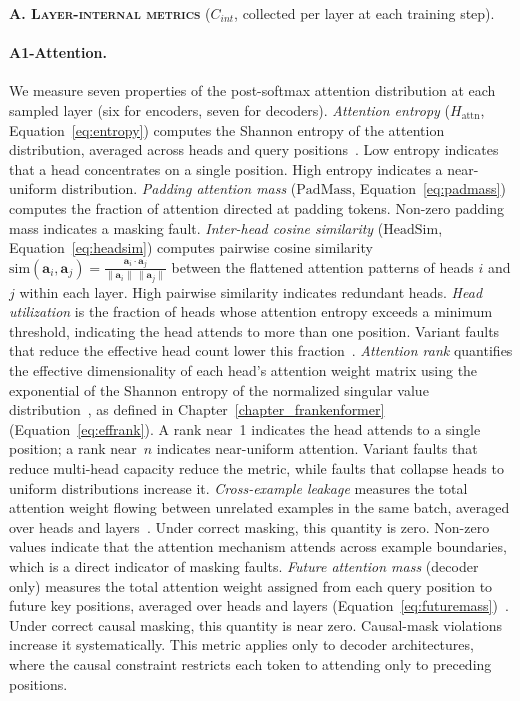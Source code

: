 \vspace{0.5em}
\noindent\textbf{\textsc{A. Layer-internal metrics}} ($C_{int}$, collected per layer at each training step).

\paragraph{A1-Attention.} We measure seven properties of the post-softmax attention distribution at each sampled layer (six for encoders, seven for decoders). \emph{Attention entropy} ($H_{\text{attn}}$, Equation~\ref{eq:entropy}) computes the Shannon entropy of the attention distribution, averaged across heads and query positions~\cite{voita2019analyzing}. Low entropy indicates that a head concentrates on a single position. High entropy indicates a near-uniform distribution. \emph{Padding attention mass} ($\mathrm{PadMass}$, Equation~\ref{eq:padmass}) computes the fraction of attention directed at padding tokens. Non-zero padding mass indicates a masking fault. \emph{Inter-head cosine similarity} ($\mathrm{HeadSim}$, Equation~\ref{eq:headsim}) computes pairwise cosine similarity $\text{sim}(\mathbf{a}_i, \mathbf{a}_j) = \frac{\mathbf{a}_i \cdot \mathbf{a}_j}{\|\mathbf{a}_i\|\,\|\mathbf{a}_j\|}$ between the flattened attention patterns of heads $i$ and $j$ within each layer. High pairwise similarity indicates redundant heads. \emph{Head utilization} is the fraction of heads whose attention entropy exceeds a minimum threshold, indicating the head attends to more than one position. Variant faults that reduce the effective head count lower this fraction~\cite{voita2019analyzing,clark2019does}. \emph{Attention rank} quantifies the effective dimensionality of each head's attention weight matrix using the exponential of the Shannon entropy of the normalized singular value distribution~\cite{roy2007effective}, as defined in Chapter~\ref{chapter_frankenformer} (Equation~\ref{eq:effrank}). A rank near~1 indicates the head attends to a single position; a rank near~$n$ indicates near-uniform attention. Variant faults that reduce multi-head capacity reduce the metric, while faults that collapse heads to uniform distributions increase it. \emph{Cross-example leakage} measures the total attention weight flowing between unrelated examples in the same batch, averaged over heads and layers~\cite{vaswani2017attention,dao2022flashattention}. Under correct masking, this quantity is zero. Non-zero values indicate that the attention mechanism attends across example boundaries, which is a direct indicator of masking faults. \emph{Future attention mass} (decoder only) measures the total attention weight assigned from each query position to future key positions, averaged over heads and layers (Equation~\ref{eq:futuremass})~\cite{vaswani2017attention}. Under correct causal masking, this quantity is near zero. Causal-mask violations increase it systematically. This metric applies only to decoder architectures, where the causal constraint restricts each token to attending only to preceding positions.

